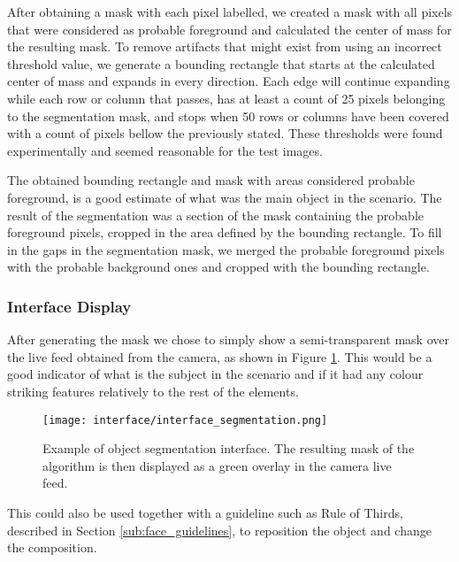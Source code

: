 After obtaining a mask with each pixel labelled, we created a mask with all pixels that were considered as probable foreground and calculated the center of mass for the resulting mask. To remove artifacts that might exist from using an incorrect threshold value, we generate a bounding rectangle that starts at the calculated center of mass and expands in every direction. Each edge will continue expanding while each row or column that passes, has at least a count of 25 pixels belonging to the segmentation mask, and stops when 50 rows or columns have been covered with a count of pixels bellow the previously stated. These thresholds were found experimentally and seemed reasonable for the test images.

The obtained bounding rectangle and mask with areas considered probable foreground, is a good estimate of what was the main object in the scenario. The result of the segmentation was a section of the mask containing the probable foreground pixels, cropped in the area defined by the bounding rectangle. To fill in the gaps in the segmentation mask, we merged the probable foreground pixels with the probable background ones and cropped with the bounding rectangle.

\subsubsection{Interface Display}

After generating the mask we chose to simply show a semi-transparent mask over the live feed obtained from the camera, as shown in Figure \ref{fig:interface_segmentation}. This would be a good indicator of what is the subject in the scenario and if it had any colour striking features relatively to the rest of the elements.

\begin{figure}[htbp]
	\centering
	\texttt{[image: interface/interface\_segmentation.png]}
    \caption{Example of object segmentation interface. The resulting mask of the algorithm is then displayed as a green overlay in the camera live feed.}
  	\label{fig:interface_segmentation}
\end{figure}

This could also be used together with a guideline such as Rule of Thirds, described in Section \ref{sub:face_guidelines}, to reposition the object and change the composition.

